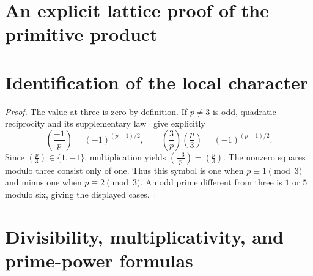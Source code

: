 \documentclass[11pt]{article}
\newtheorem{lemma}[theorem]{Lemma}
\theoremstyle{remark}
\newcommand{\leg}[2]{\left(\frac{#1}{#2}\right)}
\begin{document}
\section{An explicit lattice proof of the primitive product}\label{sec:lattice}



\section{Identification of the local character}\label{sec:character}

\begin{proof}
The value at three is zero by definition. If $p\neq3$ is odd, quadratic
reciprocity and its supplementary law~\cite{gauss} give explicitly
\[
 \leg{-1}{p}=(-1)^{(p-1)/2},\qquad
 \leg{3}{p}\leg{p}{3}=(-1)^{(p-1)/2}.
\]
Since $\leg{p}{3}\in\{1,-1\}$, multiplication yields
$\leg{-3}{p}=\leg{p}{3}$. The nonzero squares modulo three consist only of
one. Thus this symbol is one when $p\equiv1\pmod3$ and minus one when
$p\equiv2\pmod3$. An odd prime different from three is $1$ or $5$ modulo
six, giving the displayed cases.
\end{proof}

\section{Divisibility, multiplicativity, and prime-power formulas}
\end{document}
